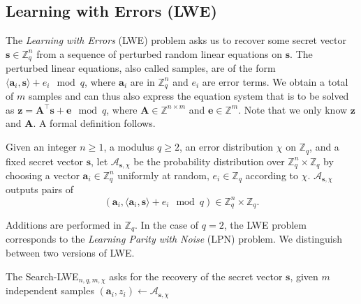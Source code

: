 \subsection{Learning with Errors (LWE)} \label{sec:lwe}
The \textit{Learning with Errors} (LWE) problem asks us to recover some secret vector $\mathbf{s} \in \mathbb{Z}_q^n$ from a sequence of perturbed random linear equations on $\mathbf{s}$. The perturbed linear equations, also called samples, are of the form $\langle\mathbf{a}_i, \mathbf{s}\rangle + e_i \mod q$, where $\mathbf{a}_i$ are in $\mathbb{Z}_q^n$ and $e_i$ are error terms. We obtain a total of $m$ samples and can thus also express the equation system that is to be solved as $\mathbf{z} = \mathbf{A}^\intercal \mathbf{s} + \mathbf{e} \mod q$, where $\mathbf{A} \in \mathbb{Z}^{n \times m}$ and $\mathbf{e} \in \mathbb{Z}^m$. Note that we only know $\mathbf{z}$ and $\mathbf{A}$. A formal definition follows.

\begin{definition} %
    Given an integer $n \geq 1$, a modulus $q \geq 2$, an error distribution $\chi$ on $\mathbb{Z}_q$, and a fixed secret vector $\mathbf{s}$, let $\mathcal{A}_{\mathbf{s}, \chi}$ be the probability distribution over $\mathbb{Z}_q^n \times \mathbb{Z}_q$ by choosing a vector $\mathbf{a}_i \in \mathbb{Z}_q^n$ uniformly at random, $e_i \in \mathbb{Z}_q$ according to $\chi$.  $\mathcal{A}_{\mathbf{s}, \chi}$ outputs pairs of
    \begin{equation}
        (\mathbf{a}_i, \langle \mathbf{a}_i, \mathbf{s} \rangle + e_i \mod q) \in \mathbb{Z}_q^n \times \mathbb{Z}_q.
    \end{equation}
\end{definition}

Additions are performed in $\mathbb{Z}_q$. In the case of $q=2$, the LWE problem corresponds to the \textit{Learning Parity with Noise} (LPN) problem. %
We distinguish between two versions of LWE.

\begin{definition} %
    The Search-LWE$_{n, q, m, \chi}$ asks for the recovery of the secret vector $\mathbf{s}$, given $m$ independent samples $(\mathbf{a}_i, z_i) \leftarrow \mathcal{A}_{\mathbf{s}, \chi}$ %
\end{definition}

